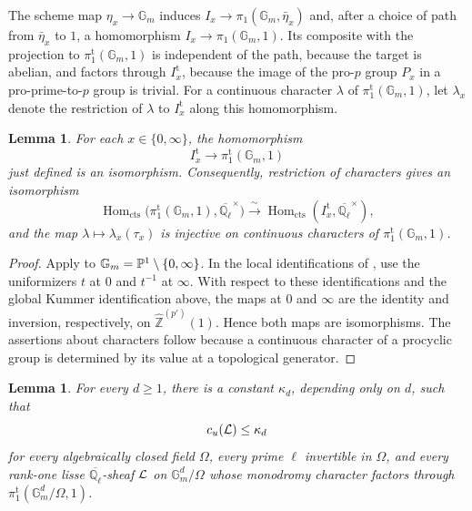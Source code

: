 \documentclass[12pt,reqno]{amsart}
\theoremstyle{definition}
\theoremstyle{plain}
\newtheorem{lem}[para]{Lemma}
\theoremstyle{definition}
\theoremstyle{remark}
\newcommand{\bbG}{\mathbb{G}}  \newcommand{\bbH}{\mathbb{H}}
\newcommand{\bbQ}{\mathbb{Q}}  \newcommand{\bbR}{\mathbb{R}}
\newcommand{\ol}[1]{\overline{#1}}
\newcommand{\Ql}{\bbQ_{\ell}}
\newcommand{\Gm}{\bbG_m}
\newcommand{\cu}{c_u}
\begin{document}
The scheme map \(\eta_x\to\Gm\) induces
\(I_x\to\pi_1(\Gm,\bar\eta_x)\) and, after a choice of path from \(\bar\eta_x\) to
\(1\), a homomorphism \(I_x\to\pi_1(\Gm,1)\).  Its composite with the projection to
\(\pi_1^{\mathrm t}(\Gm,1)\) is independent of the path, because the target is abelian, and factors
through \(I_x^{\mathrm t}\), because the image of the pro-\(p\) group \(P_x\) in a
pro-prime-to-\(p\) group is trivial.  For a continuous character \(\lambda\) of
\(\pi_1^{\mathrm t}(\Gm,1)\), let \(\lambda_x\) denote the restriction of \(\lambda\) to
\(I_x^{\mathrm t}\) along this homomorphism.

\begin{lem}
\label{lem:kummer-local-monodromy}
For each \(x\in\{0,\infty\}\), the homomorphism
\[
        I_x^{\mathrm t}\longrightarrow\pi_1^{\mathrm t}(\Gm,1)
\]
just defined is an isomorphism.  Consequently, restriction of characters gives an isomorphism
\[
        \operatorname{Hom}_{\mathrm{cts}}\bigl(\pi_1^{\mathrm t}(\Gm,1),\ol\Ql^\times\bigr)
        \xrightarrow{\ \sim\ }
        \operatorname{Hom}_{\mathrm{cts}}(I_x^{\mathrm t},\ol\Ql^\times),
\]
and the map \(\lambda\mapsto\lambda_x(\tau_x)\) is injective on continuous characters of
\(\pi_1^{\mathrm t}(\Gm,1)\).
\end{lem}

\begin{proof}
Apply \cite[Exp.~XIII, Cor.~2.12]{SGA1} to
\(\Gm=\bbP^1\setminus\{0,\infty\}\).  In the local identifications of
\cite[Exp.~XIII, Cor.~5.3]{SGA1}, use the uniformizers \(t\) at \(0\) and \(t^{-1}\) at \(\infty\).
With respect to these identifications and the global Kummer identification above, the maps at \(0\) and
\(\infty\) are the identity and inversion, respectively, on \(\widehat{\mathbb Z}^{(p')}(1)\).  Hence
both maps are isomorphisms.  The assertions about characters follow because a continuous character of a
procyclic group is determined by its value at a topological generator.
\end{proof}

\begin{lem}
\label{lem:kummer-complexity}
For every \(d\ge1\), there is a constant \(\kappa_d\), depending only on \(d\), such that
\[
        \cu(\cL)\le\kappa_d
\]
for every algebraically closed field \(\Omega\), every prime \(\ell\) invertible in \(\Omega\), and every
rank-one lisse \(\ol\Ql\)-sheaf \(\mathcal{L}\) on \(\Gm^d/\Omega\) whose monodromy character factors through
\(\pi_1^{\mathrm t}(\Gm^d/\Omega,1)\).
\end{lem}
\end{document}
